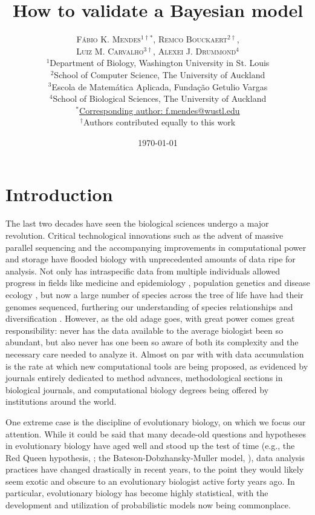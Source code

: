 \documentclass[oneside]{article}
\title{How to validate a Bayesian model} %
\author{\textsc{F\'{a}bio K. Mendes$^{1\dagger*}$}, \textsc{Remco Bouckaert$^{2\dagger}$},\\
\textsc{Luiz M. Carvalho$^{3\dagger}$}, \textsc{Alexei J. Drummond$^{4}$} \\
\small $^1$Department of Biology, Washington University in St. Louis\\
\small $^2$School of Computer Science, The University of Auckland\\
\small $^3$Escola de Matem\'{a}tica Aplicada, Fundaç\~{a}o Getulio Vargas\\
\small $^4$School of Biological Sciences, The University of Auckland\\
\small
\href{mailto:f.mendes@auckland.ac.nz}{$^*$Corresponding author: f.mendes@wustl.edu}\\
{\small $^\dagger$Authors contributed equally to this work}
}
\date{\today} %
\begin{document}
\maketitle


\section*{Introduction}
The last two decades have seen the biological sciences undergo a major revolution.
Critical technological innovations such as the advent of massive parallel sequencing and the accompanying improvements in computational power and storage have flooded biology with unprecedented amounts of data ripe for analysis.
Not only has intraspecific data from multiple individuals allowed progress in fields like medicine and epidemiology
\citep[e.g.,][]{1000g,humanmicrobiome,neafsey15}, population genetics \citep[e.g.,][]{lynch07,lack16,demanuel16} and disease ecology \citep[e.g.,][]{rosenblum13,bates18}, but now a large number of species across the tree of life have had their genomes sequenced, furthering our understanding of species relationships and diversification \citep[e.g.,][]{pease2016,kawahara19,upham19}.
However, as the old adage goes, with great power comes great responsibility: never has the data available to the average biologist been so abundant, but also never has one been so aware of both its complexity and the necessary care needed to analyze it. 
Almost on par with with data accumulation is the rate at which new computational tools are being proposed, as evidenced by journals entirely dedicated to method advances, methodological sections in biological journals, and computational biology degrees being offered by institutions around the world.

One extreme case is the discipline of evolutionary biology, on which we focus our attention.
While it could be said that many decade-old questions and hypotheses in evolutionary biology have aged well and stood up the test of time (e.g., the Red Queen hypothesis, \citealt{vanvalen73,lively87,morran11,gibson15}; the Bateson-Dobzhansky-Muller model, \citealt{dob36,muller40,hopkins12,roda17}), data analysis practices have changed drastically in recent years, to the point they would likely seem exotic and obscure to an evolutionary biologist active forty years ago. 
In particular, evolutionary biology has become highly statistical, with the development and utilization of probabilistic models now being commonplace.
\end{document}
